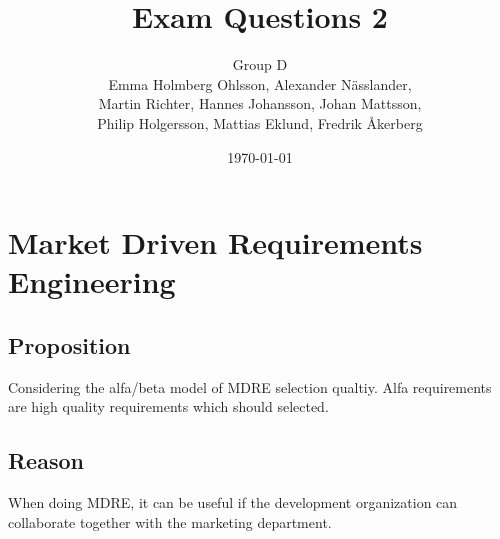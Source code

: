 \documentclass[a4paper]{article}
\title{Exam Questions 2}
\author{Group D\\ Emma Holmberg Ohlsson, Alexander Nässlander,\\Martin Richter, Hannes Johansson, Johan Mattsson,\\Philip Holgersson, Mattias Eklund, Fredrik Åkerberg}
\date{\today}
\begin{document}
	\maketitle
	\thispagestyle{empty}
	\setcounter{page}{0}
	\pagebreak


\section{Market Driven Requirements Engineering}
\subsection*{Proposition}
Considering the alfa/beta model of MDRE selection qualtiy. Alfa requirements are high quality requirements which should selected.
\subsection*{Reason}
When doing MDRE, it can be useful if the development organization can collaborate together with the marketing department.
\end{document}
